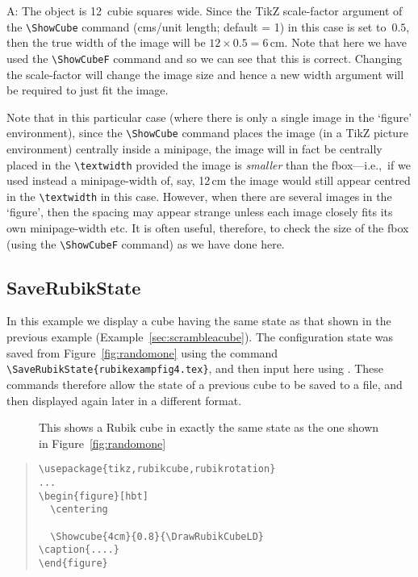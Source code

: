 \documentclass[a4paper]{article}
\begin{document}
\smallskip

{\noindent}A: The object is 12~cubie squares  wide. Since the TikZ scale-factor 
argument of the  \verb!\ShowCube! command (cms/unit length; default = 1) in this 
case is set to~$0.5$, then the true width of  the image will 
be $12 \times 0.5 = 6$\,cm. Note that here we have used the \verb!\ShowCubeF!
command and so we can see that this is correct. Changing the scale-factor will 
change the image size and hence a new width argument will be required to just fit 
the image.  

Note that in this particular case (where there is only a single image in the 
`figure' environment), since the \verb!\ShowCube! command places the image 
(in a TikZ picture environment) centrally  inside a minipage, the image will 
in fact be centrally placed in  the \verb!\textwidth! provided the image 
is \textit{smaller} than the fbox---i.e.,~if we used instead a minipage-width of, 
say, 12\,cm  the image would still  appear centred in the \verb!\textwidth! in 
this case. However, when there are several images in the `figure', then the spacing 
may appear strange unless each image closely fits its own minipage-width etc.
It is often useful, therefore, to check the size of the fbox (using the 
\verb!\ShowCubeF! command) as we have done here.
   
  
 
\pagebreak

\subsection{SaveRubikState}
\label{sec:saverubikstate}

In this example we display a cube having the same state as that shown in 
the previous example (Example~\ref{sec:scrambleacube}). The configuration state 
was saved from Figure~\ref{fig:randomone} using the  command 
\verb!\SaveRubikState{rubikexampfig4.tex}!, and then input here  
using \verb!!. These commands therefore allow  the 
state of a previous cube to be saved to a file, and then  displayed again 
later in  a different format.
\begin{figure}[hbt]
  \centering
  
\parbox{0.7\textwidth}{%
\caption{\label{fig:randomtwo}This shows a Rubik cube in exactly the  same 
state as  the one shown in Figure~\ref{fig:randomone}} }
\end{figure}
\begin{quote}
\begin{verbatim}
\usepackage{tikz,rubikcube,rubikrotation}
...
\begin{figure}[hbt]
  \centering
  
  \Showcube{4cm}{0.8}{\DrawRubikCubeLD}
\caption{....} 
\end{figure}
\end{verbatim}
\end{quote}
\end{document}
